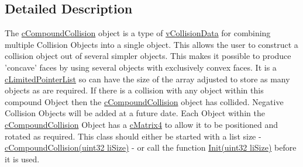 \subsection{Detailed Description}
The \hyperlink{classc_compound_collision}{cCompoundCollision} object is a type of \hyperlink{classv_collision_data}{vCollisionData} for combining multiple Collision Objects into a single object. This allows the user to construct a collision object out of several simpler objects. This makes it possible to produce 'concave' faces by using several objects with exclusively convex faces. It is a \hyperlink{classc_limited_pointer_list}{cLimitedPointerList} so can have the size of the array adjusted to store as many objects as are required. If there is a collision with any object within this compound Object then the \hyperlink{classc_compound_collision}{cCompoundCollision} object has collided. Negative Collision Objects will be added at a future date. Each Object within the \hyperlink{classc_compound_collision}{cCompoundCollision} Object has a \hyperlink{classc_matrix4}{cMatrix4} to allow it to be positioned and rotated as required. This class should either be started with a list size -\/ \hyperlink{classc_compound_collision_a8769934e6b4193ad31663288f8f55d0a}{cCompoundCollision(uint32 liSize)} -\/ or call the function \hyperlink{classc_limited_pointer_list_ab72b03a5d82ee318bf21d3102bdfecda}{Init(uint32 liSize)} before it is used. 